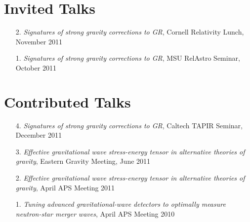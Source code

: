 \section{\sc Invited Talks}
\begin{enumerate}
\item[{2.}] {\it Signatures of strong gravity corrections to GR},
  Cornell Relativity Lunch, November 2011
\item[{1.}] {\it Signatures of strong gravity corrections to GR},
  MSU RelAstro Seminar, October 2011
\end{enumerate}

\section{\sc Contributed Talks}
\begin{enumerate}
\item[{4.}] {\it Signatures of strong gravity corrections to GR},
  Caltech TAPIR Seminar, December 2011
\item[{3.}] {\it Effective gravitational wave stress-energy tensor in
    alternative theories of gravity}, Eastern Gravity Meeting, June 2011
\item[{2.}] {\it Effective gravitational wave stress-energy tensor in alternative theories of gravity}, April APS Meeting 2011
\item[{1.}] {\it Tuning advanced gravitational-wave detectors to
    optimally measure neutron-star merger waves}, April APS Meeting 2010
\end{enumerate}
